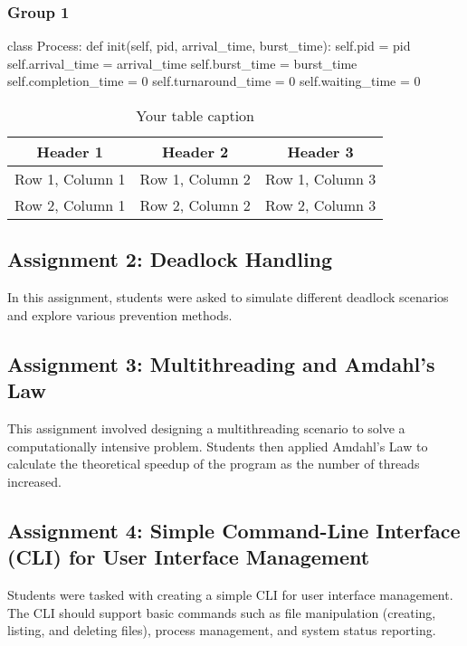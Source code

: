 \documentclass[12pt]{article}
\begin{document}
\subsubsection{Group 1}
\begin{python}
    class Process:
    def init(self, pid, arrival_time, burst_time):
    self.pid = pid
    self.arrival_time = arrival_time
    self.burst_time = burst_time
    self.completion_time = 0
    self.turnaround_time = 0
    self.waiting_time = 0
\end{python}

\begin{table}[htbp] %
    \centering
    \begin{tabular}{|c|c|c|} %
        \hline
        Header 1        & Header 2        & Header 3        \\ %
        \hline
        Row 1, Column 1 & Row 1, Column 2 & Row 1, Column 3 \\ %
        \hline
        Row 2, Column 1 & Row 2, Column 2 & Row 2, Column 3 \\ %
        \hline
    \end{tabular}
    \caption{Your table caption} %
    \label{tab:your_label} %
\end{table}

\subsection{Assignment 2: Deadlock Handling}
In this assignment, students were asked to simulate different deadlock
scenarios and explore various prevention methods.

\subsection{Assignment 3: Multithreading and Amdahl's Law}
This assignment involved designing a multithreading scenario to solve a
computationally intensive problem. Students then applied Amdahl's Law to
calculate the theoretical speedup of the program as the number of threads
increased.

\subsection{Assignment 4: Simple Command-Line Interface (CLI) for User Interface Management}
Students were tasked with creating a simple CLI for user interface
management. The CLI should support basic commands such as file manipulation
(creating, listing, and deleting files), process management, and system status
reporting.
\end{document}
